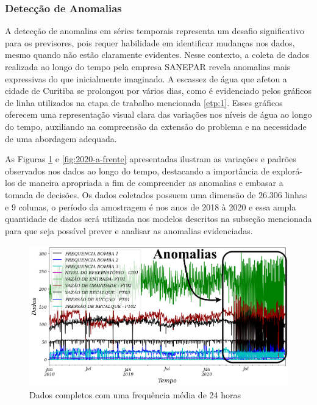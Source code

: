\subsubsection{Detec\c c\~ao de Anomalias} \label{subsec:detec}



A detecção de anomalias em séries temporais representa um desafio significativo para os previsores, pois requer habilidade em identificar mudanças nos dados, mesmo quando não estão claramente evidentes. Nesse contexto, a coleta de dados realizada ao longo do tempo pela empresa SANEPAR revela anomalias mais expressivas do que inicialmente imaginado. A escassez de água que afetou a cidade de Curitiba se prolongou por vários dias, como é evidenciado pelos gráficos de linha utilizados na etapa de trabalho mencionada \eqref{etp:1}. Esses gráficos oferecem uma representação visual clara das variações nos níveis de água ao longo do tempo, auxiliando na compreensão da extensão do problema e na necessidade de uma abordagem adequada.

As Figuras \ref{fig:dados-todos} e \ref{fig:2020-a-frente} apresentadas ilustram as variações e padrões observados nos dados ao longo do tempo, destacando a importância de explorá-los de maneira apropriada a fim de compreender as anomalias e embasar a tomada de decisões. Os dados coletados possuem uma dimensão de $26.306$ linhas e $9$ colunas, o período da amostragem é nos anos de 2018 à 2020 e essa ampla quantidade de dados será utilizada nos modelos descritos na subseção mencionada para que seja possível prever e analisar as anomalias evidenciadas.

\begin{figure}[H]
	\centering
	\caption{Dados completos com uma frequência média de 24 horas}
	\label{fig:dados-todos}
	\includegraphics[width=0.9\linewidth]{"Introducao/Figuras/dados todos"}
	
\end{figure}


